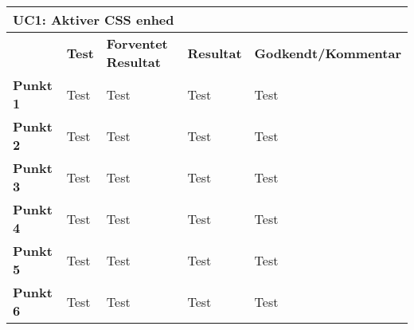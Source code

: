 \begin{table}[htbp] \centering
\begin{tabular}{|l|l|l|l|l|} %
	\hline
\multicolumn{5}{|l|}{\textbf{UC1: Aktiver CSS enhed}} \\\hline
	&\textbf{Test} &\textbf{Forventet Resultat} &\textbf{Resultat} &\textbf{Godkendt/Kommentar} \\\hline
\textbf{Punkt 1}		&Test	&Test 	&Test	&Test \\\hline
\textbf{Punkt 2}		&Test	&Test 	&Test	&Test \\\hline
\textbf{Punkt 3}		&Test	&Test 	&Test	&Test \\\hline
\textbf{Punkt 4}		&Test	&Test 	&Test	&Test \\\hline
\textbf{Punkt 5}		&Test	&Test 	&Test	&Test \\\hline
\textbf{Punkt 6}		&Test	&Test 	&Test	&Test \\\hline
	\end{tabular}
	\label{ATUC1} 
\end{table}